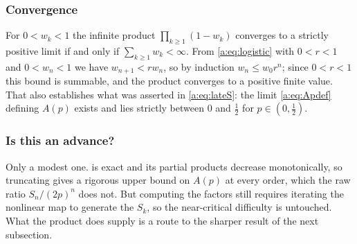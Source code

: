 \subsubsection*{Convergence}

For $0<w_k<1$ the infinite product $\prod_{k\ge1}(1-w_k)$ converges to a strictly
positive limit if and only if $\sum_{k\ge1}w_k<\infty$. From \cref{a:eq:logistic}
with $0<r<1$ and $0<w_n<1$ we have $w_{n+1}<rw_n$, so by induction
$w_n\le w_0r^n$; since $0<r<1$ this bound is summable, and the product converges to
a positive finite value. That also establishes what was asserted in
\cref{a:eq:lateS}: the limit \cref{a:eq:Apdef} defining $A(p)$ exists and lies
strictly between $0$ and $\tfrac12$ for $p\in(0,\tfrac12)$.

\subsubsection*{Is this an advance?}

Only a modest one.  is exact and its partial products decrease
monotonically, so truncating gives a rigorous upper bound on $A(p)$ at every order,
which the raw ratio $S_n/(2p)^n$ does not. But computing the factors still requires
iterating the nonlinear map to generate the $S_k$, so the near-critical difficulty
is untouched. What the product does supply is a route to the sharper result of the
next subsection.

